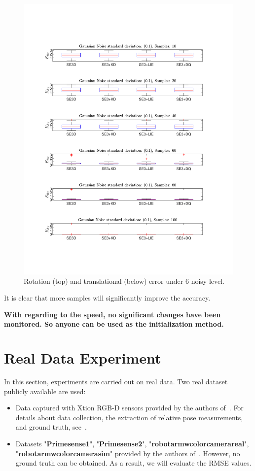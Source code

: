 \documentclass[a4paper]{report}
\begin{document}
\begin{figure}
\includegraphics[scale=0.4]{./hand_eye_figures/se3/t_vs_num}
\caption{Rotation (top) and translational (below) error under $6$ noisy level.}
\end{figure}
It is clear that more samples will significantly improve the accuracy.

\textbf{With regarding to the speed, no significant changes have been monitored. So anyone can be used as the initialization method.}


\section{Real Data Experiment}
In this section, experiments are carried out on real data. Two real dataset publicly available are used:
\begin{itemize}
\item Data captured with Xtion RGB-D sensors provided by
the authors of~\cite{brookshire2013extrinsic}. For details about data collection, the extraction of relative
pose measurements, and ground truth, see~\cite{brookshire2013extrinsic}.
\item Datasets "\textbf{Primesense{\textunderscore}1}", "\textbf{Primesense{\textunderscore}2}", "\textbf{robot{\textunderscore}arm{\textunderscore}w{\textunderscore}color{\textunderscore}camera{\textunderscore}real}", "\textbf{robot{\textunderscore}arm{\textunderscore}w{\textunderscore}color{\textunderscore}camera{\textunderscore}sim}" provided by
the authors of~\cite{furrer2018evaluation}. However, no ground truth can be obtained. As a result, we will evaluate the RMSE values.
\end{itemize}
\end{document}
